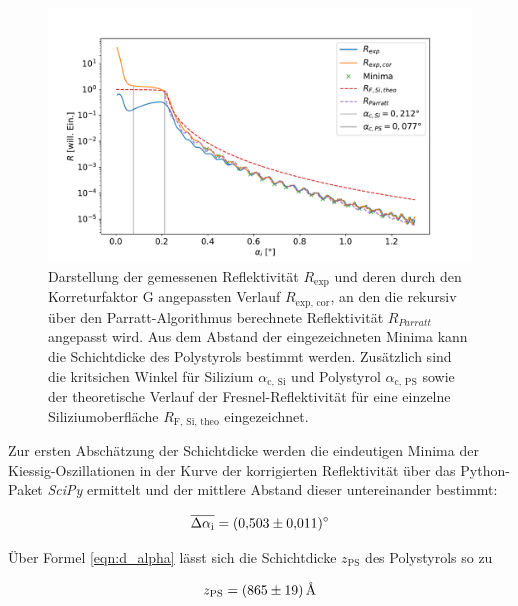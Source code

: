    \FloatBarrier
    \begin{figure}[h]
        \centering
        \includegraphics[width = \textwidth]{reflectivity_cor.pdf}
        \caption{Darstellung der gemessenen Reflektivität $R_{\text{exp}}$ und deren durch den Korreturfaktor G angepassten Verlauf $R_{\text{exp, cor}}$, an den die rekursiv über den Parratt-Algorithmus berechnete Reflektivität $R_{Parratt}$ angepasst wird. Aus dem Abstand der eingezeichneten Minima kann die Schichtdicke des Polystyrols bestimmt werden. Zusätzlich sind die kritsichen Winkel für Silizium $\alpha_{\text{c, Si}}$ und Polystyrol $\alpha_{\text{c, PS}}$ sowie der theoretische Verlauf der Fresnel-Reflektivität für eine einzelne Siliziumoberfläche $R_{\text{F, Si, theo}}$ eingezeichnet.}
        \label{fig:Reflektivität}
      \end{figure}
   
    \FloatBarrier

    Zur ersten Abschätzung der Schichtdicke werden die eindeutigen Minima der Kiessig-Oszillationen in der Kurve der korrigierten Reflektivität über das Python-Paket \textit{SciPy} ermittelt und der 
    mittlere Abstand dieser untereinander bestimmt:
    
    \begin{equation*}
      \overline{\Delta \alpha_{\text{i}}} = \SI{0.503+-0.011}{\degree}
    \end{equation*}
    
    Über Formel \ref{eqn:d_alpha} lässt sich die Schichtdicke $z_{\text{PS}}$ des Polystyrols so zu

    \begin{equation}
      z_{\text{PS}} = \SI{865+-19}{\angstrom}
      \label{eqn:z_ps}
    \end{equation}

